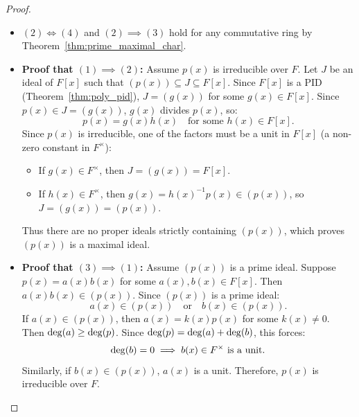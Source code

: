 \begin{proof}
\begin{itemize}[leftmargin=1.5em, itemsep=6pt]
    \item $(2) \iff (4)$ and $(2) \implies (3)$ hold for any commutative ring by Theorem~\ref{thm:prime_maximal_char}.

    \item \textbf{Proof that $(1) \implies (2)$:}
    Assume $p(x)$ is irreducible over $F$.
    Let $J$ be an ideal of $F[x]$ such that $(p(x)) \subseteq J \subseteq F[x]$.
    Since $F[x]$ is a PID (Theorem~\ref{thm:poly_pid}), $J = (g(x))$ for some $g(x) \in F[x]$.
    Since $p(x) \in J = (g(x))$, $g(x)$ divides $p(x)$, so:
    \begin{equation*}
    p(x) = g(x)h(x) \quad \text{for some } h(x) \in F[x].
    \end{equation*}
    Since $p(x)$ is irreducible, one of the factors must be a unit in $F[x]$ (a non-zero constant in $F^\times$):
    \begin{itemize}[leftmargin=1.5em, itemsep=3pt]
        \item If $g(x) \in F^\times$, then $J = (g(x)) = F[x]$.
        \item If $h(x) \in F^\times$, then $g(x) = h(x)^{-1}p(x) \in (p(x))$, so $J = (g(x)) = (p(x))$.
    \end{itemize}
    Thus there are no proper ideals strictly containing $(p(x))$, which proves $(p(x))$ is a maximal ideal.

    \item \textbf{Proof that $(3) \implies (1)$:}
    Assume $(p(x))$ is a prime ideal.
    Suppose $p(x) = a(x)b(x)$ for some $a(x), b(x) \in F[x]$.
    Then $a(x)b(x) \in (p(x))$.
    Since $(p(x))$ is a prime ideal:
    \begin{equation*}
    a(x) \in (p(x)) \quad \text{or} \quad b(x) \in (p(x)).
    \end{equation*}
    If $a(x) \in (p(x))$, then $a(x) = k(x)p(x)$ for some $k(x) \ne 0$.
    Then $\operatorname{deg}(a) \ge \operatorname{deg}(p)$.
    Since $\operatorname{deg}(p) = \operatorname{deg}(a) + \operatorname{deg}(b)$, this forces:
    \begin{equation*}
    \operatorname{deg}(b) = 0 \implies b(x) \in F^\times \text{ is a unit}.
    \end{equation*}
    Similarly, if $b(x) \in (p(x))$, $a(x)$ is a unit.
    Therefore, $p(x)$ is irreducible over $F$.
\end{itemize}
\end{proof}

